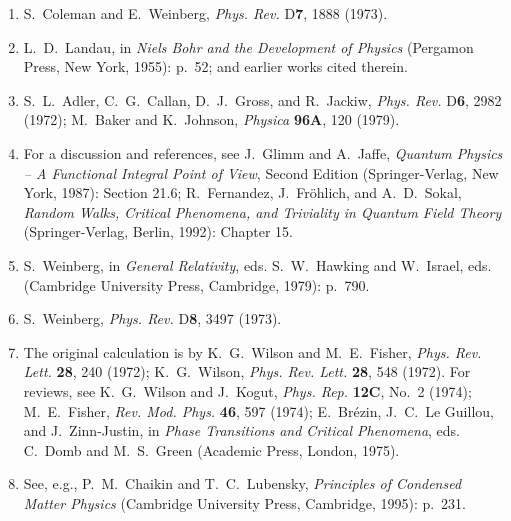 \begin{enumerate}
  \item[4a.] \label{ch18-ref-4a}
  S.~Coleman and E.~Weinberg, \textit{Phys. Rev.} D\textbf{7}, 1888 (1973).

  \item[4b.] \label{ch18-ref-4b}
  L.~D.~Landau, in \textit{Niels Bohr and the Development of Physics} (Pergamon Press, New York, 1955): p.~52; and earlier works cited therein.

  \item[4c.] \label{ch18-ref-4c}
  S.~L.~Adler, C.~G.~Callan, D.~J.~Gross, and R.~Jackiw, \textit{Phys. Rev.} D\textbf{6}, 2982 (1972); M.~Baker and K.~Johnson, \textit{Physica} \textbf{96A}, 120 (1979).

  \item[4d.] \label{ch18-ref-4d}
  For a discussion and references, see J.~Glimm and A.~Jaffe, \textit{Quantum Physics -- A Functional Integral Point of View}, Second Edition (Springer-Verlag, New York, 1987): Section 21.6; R.~Fernandez, J.~Fr\"ohlich, and A.~D.~Sokal, \textit{Random Walks, Critical Phenomena, and Triviality in Quantum Field Theory} (Springer-Verlag, Berlin, 1992): Chapter 15.

  \item {}\label{ch18-ref-5}
  S.~Weinberg, in \textit{General Relativity}, eds. S.~W.~Hawking and W.~Israel, eds. (Cambridge University Press, Cambridge, 1979): p.~790.

  \item {}\label{ch18-ref-6}
  S.~Weinberg, \textit{Phys. Rev.} D\textbf{8}, 3497 (1973).

  \item {}\label{ch18-ref-7}
  The original calculation is by K.~G.~Wilson and M.~E.~Fisher, \textit{Phys. Rev. Lett.} \textbf{28}, 240 (1972); K.~G.~Wilson, \textit{Phys. Rev. Lett.} \textbf{28}, 548 (1972). For reviews, see K.~G.~Wilson and J.~Kogut, \textit{Phys. Rep.} \textbf{12C}, No.~2 (1974); M.~E.~Fisher, \textit{Rev. Mod. Phys.} \textbf{46}, 597 (1974); E.~Br\'ezin, J.~C.~Le Guillou, and J.~Zinn-Justin, in \textit{Phase Transitions and Critical Phenomena}, eds. C.~Domb and M.~S.~Green (Academic Press, London, 1975).

  \item {}\label{ch18-ref-8}
  See, e.g., P.~M.~Chaikin and T.~C.~Lubensky, \textit{Principles of Condensed Matter Physics} (Cambridge University Press, Cambridge, 1995): p.~231.


\end{enumerate}
